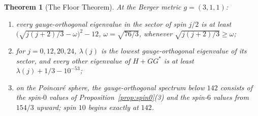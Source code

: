 \documentclass[11pt]{article}
\newtheorem{theorem}{Theorem}[section]
\theoremstyle{definition}
\theoremstyle{remark}
\begin{document}
\begin{theorem}[The Floor Theorem]\label{thm:gap}
At the Berger metric $g=(3,1,1)$:
\begin{enumerate}
  \item every gauge-orthogonal eigenvalue in the sector of spin $j/2$ is at least
    $\bigl(\sqrt{j(j+2)/3}-\omega\bigr)^2-12$, $\omega=\sqrt{76/3}$, whenever $\sqrt{j(j+2)/3}\ge\omega$;
  \item for $j=0,12,20,24$, $\lambda(j)$ is the lowest gauge-orthogonal eigenvalue of its sector, and every
    other eigenvalue of $H+GG^*$ is at least $\lambda(j)+1/3-10^{-53}$;
  \item on the Poincar\'e sphere, the gauge-orthogonal spectrum below $142$ consists of the spin-$0$
    values of Proposition~\ref{prop:spin0}(3) and the spin-$6$ values from $154/3$ upward; spin $10$
    begins exactly at $142$.
\end{enumerate}
\end{theorem}
\end{document}
